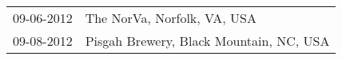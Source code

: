 \begin{supertabular}{ll}
 09-06-2012 &              The NorVa, Norfolk, VA, USA \\
 09-08-2012 &  Pisgah Brewery, Black Mountain, NC, USA \\
\end{supertabular}
